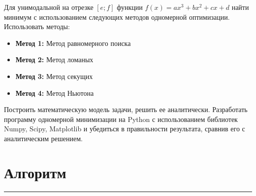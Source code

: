 \documentclass[a4paper, 14pt]{extarticle}
\begin{document}
Для унимодальной на отрезке $[e; f]$ функции $f(x) = a x^3 + b x^2 + c x + d$ найти минимум с использованием 
следующих методов одномерной оптимизации.
Использовать методы:
\begin{itemize}
    \item \textbf{Метод 1:} Метод равномерного поиска \\
    \item \textbf{Метод 2:} Метод ломаных \\
    \item \textbf{Метод 3:} Метод секущих \\
    \item \textbf{Метод 4:} Метод Ньютона \\
\end{itemize}

Построить математическую модель задачи, решить ее аналитически.
Разработать программу одномерной минимизации на Python с использованием
библиотек Numpy, Scipy, Matplotlib и убедиться в правильности результата,
сравнив его с аналитическим решением.

\section*{Алгоритм}\vspace{-20pt}\rule{\linewidth}{0.1mm}
\end{document}
